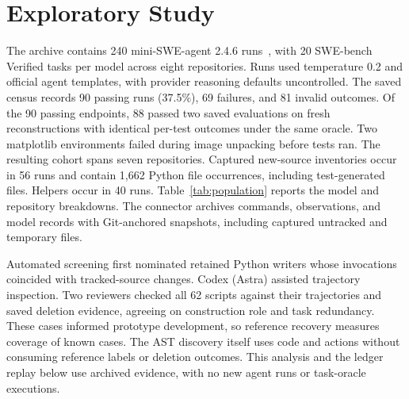 \documentclass[10pt,conference]{IEEEtran}
\begin{document}
\section{Exploratory Study}
\label{sec:study}
The archive contains 240 mini-SWE-agent 2.4.6 runs~\cite{mini}, with 20 SWE-bench Verified tasks per model across eight repositories. Runs used temperature 0.2 and official agent templates, with provider reasoning defaults uncontrolled. The saved census records 90 passing runs (37.5\%), 69 failures, and 81 invalid outcomes. Of the 90 passing endpoints, 88 passed two saved evaluations on fresh reconstructions with identical per-test outcomes under the same oracle. Two matplotlib environments failed during image unpacking before tests ran. The resulting cohort spans seven repositories. Captured new-source inventories occur in 56 runs and contain 1,662 Python file occurrences, including test-generated files. Helpers occur in 40 runs. Table~\ref{tab:population} reports the model and repository breakdowns. The connector archives commands, observations, and model records with Git-anchored snapshots, including captured untracked and temporary files.

Automated screening first nominated retained Python writers whose invocations coincided with tracked-source changes. Codex (Astra) assisted trajectory inspection. Two reviewers checked all 62 scripts against their trajectories and saved deletion evidence, agreeing on construction role and task redundancy. These cases informed prototype development, so reference recovery measures coverage of known cases. The AST discovery itself uses code and actions without consuming reference labels or deletion outcomes. This analysis and the ledger replay below use archived evidence, with no new agent runs or task-oracle executions.
\end{document}
